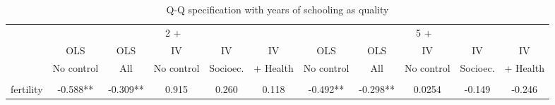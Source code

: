 \documentclass{article}[11pt,subeqn]
\begin{document}
\begin{spacing}{1.5}
\begin{sidewaystable}[!htbp]																					
\caption{Q-Q specification with years of schooling as quality}																					
\vspace{-3mm}																					
\label{tab:YrsEduc}																					
\begin{center}																					
\begin{tabular}{lcccccccccc} \toprule																					
& \multicolumn{5}{c}{2 +} & \multicolumn{5}{c}{5 +} \\ \cmidrule(r){2-6} \cmidrule(r){7-11}																					
& OLS  & OLS & IV & IV  & IV  & OLS  & OLS & IV  & IV  & IV \\ 																					
& No control & All & No control &  Socioec. & + Health & No control & All & No control &  Socioec. & + Health \\ \midrule
\begin{footnotesize}\end{footnotesize}&\begin{footnotesize}\end{footnotesize}&\begin{footnotesize}\end{footnotesize}&\begin{footnotesize}\end{footnotesize}&\begin{footnotesize}\end{footnotesize}&\begin{footnotesize}\end{footnotesize}&\begin{footnotesize}\end{footnotesize}&\begin{footnotesize}\end{footnotesize}&\begin{footnotesize}\end{footnotesize}&\begin{footnotesize}\end{footnotesize}&\begin{footnotesize}\end{footnotesize}\\																					
fertility	&	-0.588**	&	-0.309**	&	0.915	&	0.260	&	0.118	&	-0.492**	&	-0.298**	&	0.0254	&	-0.149	&	-0.246	\\

\end{tabular}
\end{center}
\end{sidewaystable}
\end{spacing}
\end{document}
